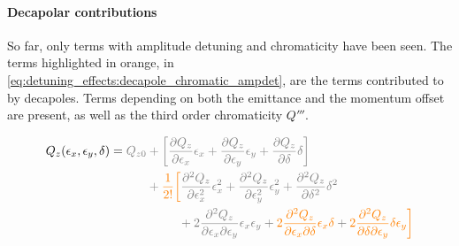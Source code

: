 \paragraph{Decapolar contributions}

So far, only terms with amplitude detuning and chromaticity have been seen.  
The terms highlighted in orange, in \cref{eq:detuning_effects:decapole_chromatic_ampdet}, are
the terms contributed to by decapoles. Terms depending on both the emittance and the momentum offset
are present, as well as the third order chromaticity $Q'''$.

\begin{equation}
\begin{aligned}
Q_z(\epsilon_x, \epsilon_y, \delta) = \color{gray}Q_{z0} &\color{gray}+
                                                \left[
                                                   \frac{\partial Q_z}{\partial \epsilon_x} \epsilon_x
                                                 + \frac{\partial Q_z}{\partial \epsilon_y} \epsilon_y
                                                 + \frac{\partial Q_z}{\partial \delta} \delta
                                                \right] \\
                                             &\color{gray}
                                             + \textcolor{orange}{\frac{1}{2!} \biggl[}
                                                   \frac{\partial^2Q_z}{\partial \epsilon_x^2}\epsilon_x^2 
                                                 + \frac{\partial^2Q_z}{\partial \epsilon_y^2}\epsilon_y^2
                                                 + \frac{\partial^2 Q_z}{\partial \delta^2} \delta^2  \\
                                             &\;\begin{aligned}
                                             \phantom{+ \frac{1}{2!} \biggl[}
                                               & \color{gray}
                                               + 2 \frac{\partial^2Q_z}{\partial \epsilon_x \partial \epsilon_y}\epsilon_x \epsilon_y
                                               + \textcolor{orange}{2 \frac{\partial^2Q_z}{\partial \epsilon_x \partial \delta}\epsilon_x \delta}
                                               + \textcolor{orange}{2 \frac{\partial^2Q_z}{\partial \delta \partial \epsilon_y} \delta \epsilon_y}
                                             \textcolor{orange}{\biggr]} \\
                                             \end{aligned} \\

\end{aligned}
\end{equation}
